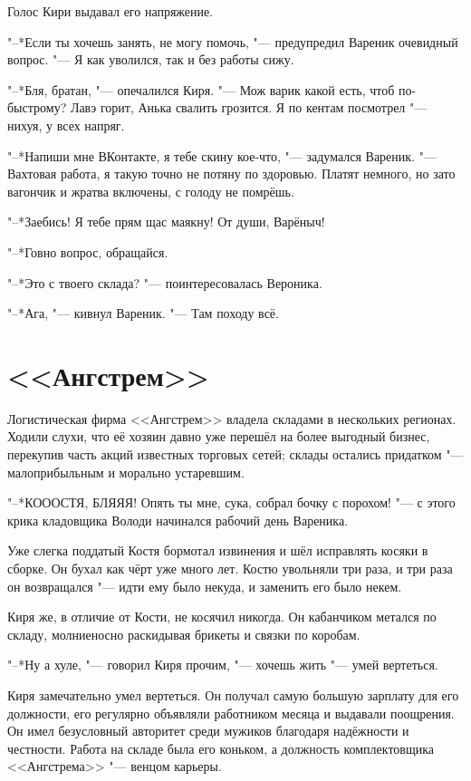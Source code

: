 Голос Кири выдавал его напряжение.

"--*Если ты хочешь занять, не могу помочь, "--- предупредил Вареник очевидный вопрос.
"--- Я как уволился, так и без работы сижу.

"--*Бля, братан, "--- опечалился Киря.
"--- Мож варик какой есть, чтоб по-быстрому?
Лавэ горит, Анька свалить грозится.
Я по кентам посмотрел "--- нихуя, у всех напряг.

"--*Напиши мне ВКонтакте, я тебе скину кое-что, "--- задумался Вареник.
"--- Вахтовая работа, я такую точно не потяну по здоровью.
Платят немного, но зато вагончик и жратва включены, с голоду не помрёшь.

"--*Заебись!
Я тебе прям щас маякну!
От души, Варёныч!

"--*Говно вопрос, обращайся.

"--*Это с твоего склада? "--- поинтересовалась Вероника.

"--*Ага, "--- кивнул Вареник.
"--- Там походу всё.

\section{<<Ангстрем>>}

Логистическая фирма <<Ангстрем>> владела складами в нескольких регионах.
Ходили слухи, что её хозяин давно уже перешёл на более выгодный бизнес, перекупив часть акций известных торговых сетей;
склады остались придатком "--- малоприбыльным и морально устаревшим.

"--*КОООСТЯ, БЛЯЯЯ!
Опять ты мне, сука, собрал бочку с порохом! "--- с этого крика кладовщика Володи начинался рабочий день Вареника.

Уже слегка поддатый Костя бормотал извинения и шёл исправлять косяки в сборке.
Он бухал как чёрт уже много лет.
Костю увольняли три раза, и три раза он возвращался "--- идти ему было некуда, и заменить его было некем.

Киря же, в отличие от Кости, не косячил никогда.
Он кабанчиком метался по складу, молниеносно раскидывая брикеты и связки по коробам.

"--*Ну а хуле, "--- говорил Киря прочим, "--- хочешь жить "--- умей вертеться.

Киря замечательно умел вертеться.
Он получал самую большую зарплату для его должности, его регулярно объявляли работником месяца и выдавали поощрения.
Он имел безусловный авторитет среди мужиков благодаря надёжности и честности.
Работа на складе была его коньком, а должность комплектовщика <<Ангстрема>> "--- венцом карьеры.

